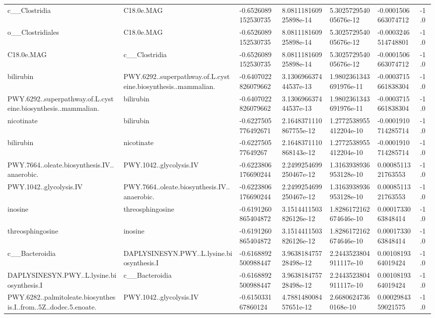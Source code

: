 \begin{longtable}{lllllll}
c\_\_Clostridia & C18.0e.MAG & -0.6526089152530735 & 8.081118160925898e-14 & 5.302572954005676e-12 & -0.0001506663074712 & -1.0 \\
o\_\_Clostridiales & C18.0e.MAG & -0.6526089152530735 & 8.081118160925898e-14 & 5.302572954005676e-12 & -0.0003246514748801 & -1.0 \\
C18.0e.MAG & c\_\_Clostridia & -0.6526089152530735 & 8.081118160925898e-14 & 5.302572954005676e-12 & -0.0001506663074712 & -1.0 \\
bilirubin & PWY.6292..superpathway.of.L.cysteine.biosynthesis..mammalian. & -0.6407022826079662 & 3.130696637444537e-13 & 1.9802361343691976e-11 & -0.0003715661838304 & -1.0 \\
PWY.6292..superpathway.of.L.cysteine.biosynthesis..mammalian. & bilirubin & -0.6407022826079662 & 3.130696637444537e-13 & 1.9802361343691976e-11 & -0.0003715661838304 & -1.0 \\
nicotinate & bilirubin & -0.6227505776492671 & 2.1648371110867755e-12 & 1.2772538955412204e-10 & -0.0001910714285714 & -1.0 \\
bilirubin & nicotinate & -0.622750577649267 & 2.1648371110868143e-12 & 1.2772538955412204e-10 & -0.0001910714285714 & -1.0 \\
PWY.7664..oleate.biosynthesis.IV..anaerobic. & PWY.1042..glycolysis.IV & -0.6223806176690244 & 2.2499254699250467e-12 & 1.3163938936953128e-10 & 0.0008511321763553 & -1.0 \\
PWY.1042..glycolysis.IV & PWY.7664..oleate.biosynthesis.IV..anaerobic. & -0.6223806176690244 & 2.2499254699250467e-12 & 1.3163938936953128e-10 & 0.0008511321763553 & -1.0 \\
inosine & threosphingosine & -0.6191260865404872 & 3.1514411503826126e-12 & 1.8286172162674646e-10 & 0.0001733063848414 & -1.0 \\
threosphingosine & inosine & -0.6191260865404872 & 3.1514411503826126e-12 & 1.8286172162674646e-10 & 0.0001733063848414 & -1.0 \\
c\_\_Bacteroidia & DAPLYSINESYN.PWY..L.lysine.biosynthesis.I & -0.6168892500988447 & 3.963818475728498e-12 & 2.2443523804911117e-10 & 0.0010819364019424 & -1.0 \\
DAPLYSINESYN.PWY..L.lysine.biosynthesis.I & c\_\_Bacteroidia & -0.6168892500988447 & 3.963818475728498e-12 & 2.2443523804911117e-10 & 0.0010819364019424 & -1.0 \\
PWY.6282..palmitoleate.biosynthesis.I..from..5Z..dodec.5.enoate. & PWY.1042..glycolysis.IV & -0.615033167860124 & 4.788148008457651e-12 & 2.66806247360168e-10 & 0.0002984359021575 & -1.0 \\

\end{longtable}
